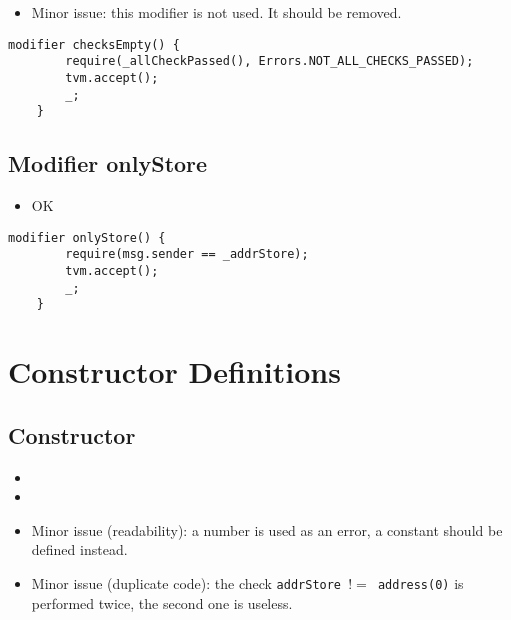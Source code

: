 \begin{itemize}
\item Minor issue: this modifier is not used. It should be removed.
\end{itemize}

\begin{lstlisting}[firstnumber=66]
    modifier checksEmpty() {
        require(_allCheckPassed(), Errors.NOT_ALL_CHECKS_PASSED);
        tvm.accept();
        _;
    }
\end{lstlisting}

\subsection{Modifier onlyStore}

\begin{itemize}
\item OK
\end{itemize}


\begin{lstlisting}[firstnumber=72]
    modifier onlyStore() {
        require(msg.sender == _addrStore);
        tvm.accept();
        _;
    }
\end{lstlisting}

\section{Constructor Definitions}


\subsection{Constructor}

\begin{itemize}
\item {}
\item {}
\item Minor issue (readability): a number is used as an error, a
  constant should be defined instead.
\item Minor issue (duplicate code): the check {\tt addrStore $!=$
  address(0)} is performed twice, the second one is useless.
\end{itemize}

